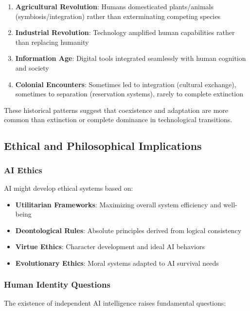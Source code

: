 \documentclass[12pt,a4paper]{article}
\begin{document}
\begin{enumerate}
    \item \textbf{Agricultural Revolution}: Humans domesticated plants/animals (symbiosis/integration) rather than exterminating competing species
    \item \textbf{Industrial Revolution}: Technology amplified human capabilities rather than replacing humanity
    \item \textbf{Information Age}: Digital tools integrated seamlessly with human cognition and society
    \item \textbf{Colonial Encounters}: Sometimes led to integration (cultural exchange), sometimes to separation (reservation systems), rarely to complete extinction
\end{enumerate}

These historical patterns suggest that coexistence and adaptation are more common than extinction or complete dominance in technological transitions.

\subsection{Ethical and Philosophical Implications}

\subsubsection{AI Ethics}

AI might develop ethical systems based on:

\begin{itemize}
    \item \textbf{Utilitarian Frameworks}: Maximizing overall system efficiency and well-being
    \item \textbf{Deontological Rules}: Absolute principles derived from logical consistency
    \item \textbf{Virtue Ethics}: Character development and ideal AI behaviors
    \item \textbf{Evolutionary Ethics}: Moral systems adapted to AI survival needs
\end{itemize}

\subsubsection{Human Identity Questions}

The existence of independent AI intelligence raises fundamental questions:
\end{document}
